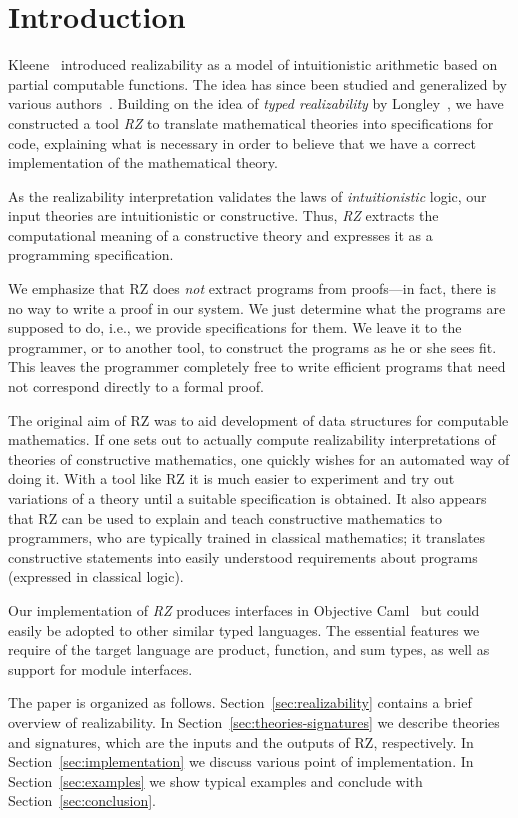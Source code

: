 \section{Introduction}
\label{sec:introduction}

Kleene~\cite{KleeneSC:intint} introduced realizability as a model of
intuitionistic arithmetic based on partial computable functions. The
idea has since been studied and generalized by various
authors~\cite{TroelstraA:rea,HylandJ:efft,HylandJ:trit,OostenJ:exer}.
Building on the idea of \emph{typed realizability} by
Longley~\cite{Longley00}, we have constructed a tool \emph{RZ} to
translate mathematical theories into specifications for code,
explaining what is necessary in order to believe that we have a correct
implementation of the mathematical theory.

As the realizability interpretation validates the laws of
\emph{intuitionistic} logic, our input theories are intuitionistic or
constructive. Thus, \emph{RZ} extracts the computational
meaning of a constructive theory and expresses it as a programming
specification.

We emphasize that RZ does \emph{not} extract programs from proofs---in
fact, there is no way to write a proof in our system. We just
determine what the programs are supposed to do, i.e., we provide
specifications for them. We leave it to the programmer, or to another
tool, to construct the programs as he or she sees fit. This leaves
the programmer completely free to write efficient programs
that need not correspond directly to a formal proof.

The original aim of RZ was to aid development of data structures
for computable mathematics. If one sets out to actually compute
realizability interpretations of theories of constructive mathematics,
one quickly wishes for an automated way of doing it. With a tool like
RZ it is much easier to experiment and try out variations of a theory
until a suitable specification is obtained.  It also appears that
RZ can be used to explain and teach constructive mathematics to
programmers, who are typically trained in classical mathematics; 
it translates constructive statements into easily understood
requirements about programs (expressed in classical logic).

Our implementation of \emph{RZ} produces interfaces in Objective
Caml~\cite{ocaml} but could easily be adopted to other similar typed
languages.  The essential features we require of the target language
are product, function, and sum types, as well as support for module
interfaces.

The paper is organized as follows. Section~\ref{sec:realizability}
contains a brief overview of realizability. In
Section~\ref{sec:theories-signatures} we describe theories and
signatures, which are the inputs and the outputs of RZ, respectively. In
Section~\ref{sec:implementation} we discuss various point of
implementation. In Section~\ref{sec:examples} we show typical examples
and conclude with Section~\ref{sec:conclusion}.


